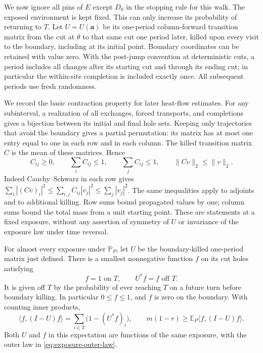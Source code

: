 We now ignore all pins of \(E\) except \(D_0\) in the stopping
rule for this walk.  The exposed environment is kept fixed.  This can
only increase its probability of returning to \(T\).  Let
\(U=U(\mathbf a)\) be its one-period column-forward transition
matrix from the cut at \(\theta\) to that same cut one period later,
killed upon every visit to the boundary, including at its initial
point.  Boundary coordinates can be retained with value zero.
With the post-jump convention at deterministic cuts, a period includes
all changes after its starting cut and through its ending cut; in
particular the within-site completion is included exactly once.
All subsequent periods use fresh randomness.

We record the basic contraction property for later heat-flow estimates.
For any subinterval, a realization of all exchanges, forced transports,
and completions gives a bijection between its initial and final hole
sets.  Keeping only trajectories that avoid the boundary gives a
partial permutation: its matrix has at most one entry equal to one
in each row and in each column.  The killed transition matrix \(C\)
is the mean of these matrices.  Hence
\begin{equation}
 C_{ij}\ge0,\qquad
 \sum_i C_{ij}\le1,\qquad \sum_j C_{ij}\le1,
 \qquad \|Cv\|_2\le\|v\|_2.
 \label{eq:hole-contractions}
\end{equation}
Indeed Cauchy--Schwarz in each row gives
\(\sum_i|(Cv)_i|^2\le\sum_{i,j}C_{ij}|v_j|^2
\le\sum_j|v_j|^2\).  The same inequalities apply to adjoints and
to additional killing.  Row sums bound propagated values by one;
column sums bound the total mass from a unit starting point.  These
are statements at a fixed exposure, without any assertion of symmetry
of \(U\) or invariance of the exposure law under time reversal.

\begin{lemma}
\label{lem:return-energy}
For almost every exposure under \(\mathbb P_P\), let \(U\) be the
boundary-killed one-period matrix just defined.  There is a smallest
nonnegative function \(f\) on its cut holes satisfying
\begin{equation}
 f=1\text{ on }T,\qquad U^*f=f\text{ off }T.
 \label{eq:minimal-hitting-harmonicity}
\end{equation}
It is given off \(T\) by the probability of ever reaching \(T\)
on a future turn before boundary killing.  In particular
\(0\le f\le1\), and \(f\) is zero on the boundary.  With counting
inner products,
\begin{equation}
 \langle f,(I-U)f\rangle
        =\sum_{i\in T}\bigl(1-(U^*f)_i\bigr),
 \qquad
 m(1-r)\ge
       \mathbb E_P\langle f,(I-U)f\rangle.
 \label{eq:return-energy}
\end{equation}
Both \(U\) and \(f\) in this expectation are functions of the same
exposure, with the outer law in \eqref{eq:exposure-outer-law}.
\end{lemma}

